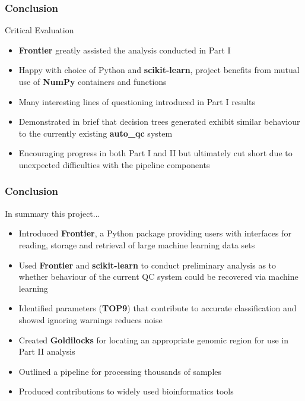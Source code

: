 \documentclass{beamer}
\begin{document}
\begin{frame}[t]
\frametitle{Conclusion}
    \begin{beamerboxesrounded}[shadow=true]{}
        \begin{center}
            Critical Evaluation
        \end{center}
    \end{beamerboxesrounded}
    \begin{itemize}
        \item \textbf{Frontier} greatly assisted the analysis conducted in Part I
        \item Happy with choice of Python and \textbf{scikit-learn}, project benefits
            from mutual use of \textbf{NumPy} containers and functions
        \item Many interesting lines of questioning introduced in Part I results
        \item Demonstrated in brief that decision trees generated exhibit similar
            behaviour to the currently existing \textbf{auto\_qc} system
        \item Encouraging progress in both Part I and II but ultimately cut short
            due to unexpected difficulties with the pipeline components
    \end{itemize}
\end{frame}

\begin{frame}[t]
\frametitle{Conclusion}
    \begin{beamerboxesrounded}[shadow=true]{}
        \begin{center}
            In summary this project...
        \end{center}
    \end{beamerboxesrounded}
    \begin{itemize}
        \item Introduced \textbf{Frontier}, a Python package providing users with
            interfaces for reading, storage and retrieval of large machine learning
            data sets
        \item Used \textbf{Frontier} and \textbf{scikit-learn} to conduct preliminary
            analysis as to whether behaviour of the current QC system could be recovered
            via machine learning
        \item Identified parameters (\textbf{TOP9}) that contribute to accurate
            classification and showed ignoring warnings reduces noise
        \item Created \textbf{Goldilocks} for locating an appropriate genomic
            region for use in Part II analysis
        \item Outlined a pipeline for processing thousands of samples
        \item Produced contributions to widely used bioinformatics tools
    \end{itemize}
\end{frame}
\end{document}
